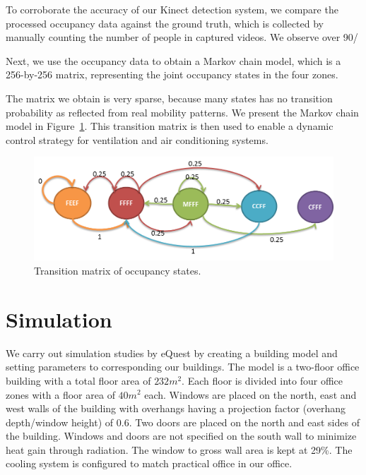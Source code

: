 \documentclass{sig-alternate}
\begin{document}
\par

To corroborate the accuracy of our Kinect detection system, we compare
the processed occupancy data against the ground truth, which is
collected by manually counting the number of people in captured
videos.  We observe over 90/%

Next, we use the occupancy data to obtain a Markov chain model, which
is a 256-by-256 matrix, representing the joint occupancy states in the
four zones. 


\par
The matrix we obtain is very sparse, because many states has no
transition probability as reflected from real mobility patterns. We
present the Markov chain model in
Figure~\ref{fig:transitional-matrix}. This transition matrix is then
used to enable a dynamic control strategy for ventilation and air
conditioning systems.  



\begin{figure}[!tb]
  \centering
  \includegraphics[scale=0.45]{mcc}
  \caption{Transition matrix of occupancy states.}
  \label{fig:transitional-matrix}
\end{figure}



\section{Simulation}
\label{sec:simulation}

We carry out simulation studies by eQuest by creating a building model
and setting parameters to corresponding our buildings. The model is a
two-floor office building with a total floor area of $232m^{2}$. Each
floor is divided into four office zones with a floor area of $40m^{2}$
each. Windows are placed on the north, east and west walls of the
building with overhangs having a projection factor (overhang
depth/window height) of $0.6$. Two doors are placed on the north and
east sides of the building. Windows and doors are not specified on the
south wall to minimize heat gain through radiation. The window to
gross wall area is kept at 29\%. The cooling system is configured to
match practical office in our office.  
\end{document}
